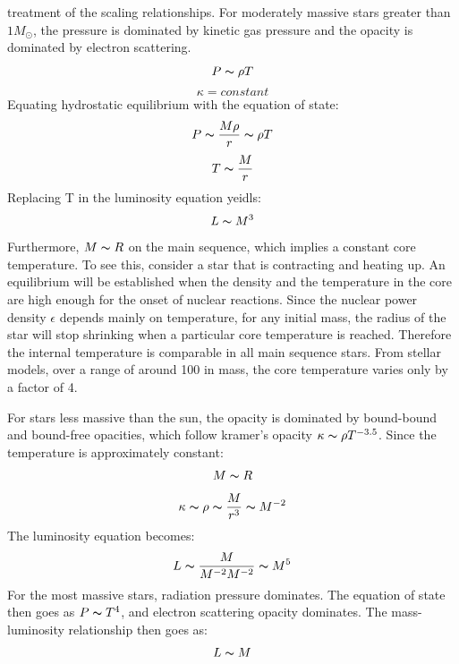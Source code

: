  treatment of the scaling relationships.
For moderately massive stars greater than $1 M_\odot$, the pressure is dominated by kinetic gas pressure and the opacity is dominated by electron scattering.
\begin{equation}
P \thicksim \rho T
\end{equation}
\begin{equation}
\kappa = constant
\end{equation}
Equating hydrostatic equilibrium with the equation of state:
\begin{equation}
P \thicksim \frac{M\rho}{r} \thicksim \rho T
\end{equation}
\begin{equation}
T \thicksim \frac{M}{r}
\end{equation}
Replacing T in the luminosity equation yeidls:
\begin{equation}
L \thicksim M^3
\end{equation}
Furthermore, $M \thicksim R$ on the main sequence, which implies a constant core temperature.  To see this, consider a star that is contracting and heating up.  An equilibrium will be established when the density and the temperature in the core are high enough for the onset of nuclear reactions.  Since the nuclear power density $\epsilon$ depends mainly on temperature, for any initial mass, the radius of the star will stop shrinking when a particular core temperature is reached.  Therefore the internal temperature is comparable in all main sequence stars.  From stellar models, over a range of around 100 in mass, the core temperature varies only by a factor of 4.  

For stars less massive than the sun, the opacity is dominated by bound-bound and bound-free opacities, which follow kramer's opacity $\kappa \thicksim \rho T^{-3.5}$.  Since the temperature is approximately constant:
\begin{equation}
 M \thicksim R
\end{equation}
\begin{equation}
\kappa \thicksim \rho \thicksim \frac{M}{r^3} \thicksim M^{-2}
\end{equation}
The luminosity equation becomes:
\begin{equation}
L \thicksim \frac{M}{M^{-2}M^{-2}} \thicksim M^{5}
\end{equation}
For the most massive stars, radiation pressure dominates.  The equation of state then goes as $P \thicksim T^4$, and electron scattering opacity dominates.  The mass-luminosity relationship then goes as:
\begin{equation}
L \thicksim M
\end{equation}

